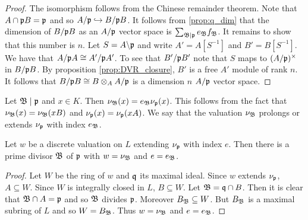 \documentclass{memoir}
\begin{document}
\begin{proof}
    The isomorphism follows from the Chinese remainder theorem.
    Note that $A\cap \mathfrak{p}B = \mathfrak{p}$ and so $A/\mathfrak{p}\hookrightarrow B/\mathfrak{p}B$.
    It follows from \ref{prop:q_dim} that the dimension of $B/\mathfrak{p}B$ as an $A/\mathfrak{p}$ vector space is $\sum_{\mathfrak{B}\mid \mathfrak{p}}e_{\mathfrak{B}}f_{\mathfrak{B}}$.
    It remains to show that this number is $n$.
    Let $S = A\backslash \mathfrak{p}$ and write $A' = A[S^{-1}]$ and $B' = B[S^{-1}]$.
    We have that $A/\mathfrak{p}A \cong A'/\mathfrak{p}A'$.
    To see that $B'/\mathfrak{p}B'$ note that $S$ maps to $(A/\mathfrak{p})^\times$ in $B/\mathfrak{p}B$.
    By proposition \ref{prop:DVR_closure}, $B'$ is a free $A'$ module of rank $n$.
    It follows that $B/\mathfrak{p}B \cong B\otimes_AA/\mathfrak{p}$ is a dimension $n$ $A/\mathfrak{p}$ vector space.
\end{proof}
\begin{remark}
    Let $\mathfrak{B}\mid \mathfrak{p}$ and $x\in K$.
    Then $\nu_{\mathfrak{B}}(x) = e_{\mathfrak{B}}\nu_{\mathfrak{p}}(x)$.
    This follows from the fact that $\nu_{\mathfrak{B}}(x) = \nu_{\mathfrak{B}}(xB)$ and $\nu_{\mathfrak{p}}(x) = \nu_{\mathfrak{p}}(xA)$.
    We say that the valuation $\nu_{\mathfrak{B}}$ prolongs or extends $\nu_{\mathfrak{p}}$ with index $e_{\mathfrak{B}}$.
\end{remark}
\begin{proposition}
    Let $w$ be a discrete valuation on $L$ extending $\nu_{\mathfrak{p}}$ with index $e$.
    Then there is a prime divisor $\mathfrak{B}$ of $\mathfrak{p}$ with $w = \nu_{\mathfrak{B}}$ and $e = e_{\mathfrak{B}}$.
\end{proposition}
\begin{proof}
    Let $W$ be the ring of $w$ and $\mathfrak{q}$ its maximal ideal.
    Since $w$ extends $\nu_{\mathfrak{p}}$, $A\subseteq W$.
    Since $W$ is integrally closed in $L$, $B\subseteq W$.
    Let $\mathfrak{B} = \mathfrak{q} \cap B$.
    Then it is clear that $\mathfrak{B} \cap A = \mathfrak{p}$ and so $\mathfrak{B}$ divides $\mathfrak{p}$.
    Moreover $B_{\mathfrak{B}}\subseteq W$.
    But $B_{\mathfrak{B}}$ is a maximal subring of $L$ and so $W = B_{\mathfrak{B}}$.
    Thus $w = \nu_{\mathfrak{B}}$ and $e = e_{\mathfrak{B}}$.
\end{proof}
\end{document}

